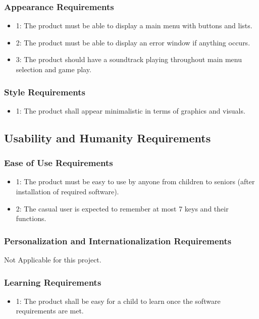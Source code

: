 \documentclass[12pt]{article}
\begin{document}
\subsubsection*{Appearance Requirements}
\begin{itemize}
\item 1: The product must be able to display a main menu with buttons and lists.
\item 2: The product must be able to display an error window if anything occurs.
\item 3: The product should have a soundtrack playing throughout main menu selection and game play.
\end{itemize}

\subsubsection*{Style Requirements}
\begin{itemize}
\item 1: The product shall appear minimalistic in terms of graphics and visuals.
\end{itemize}

\subsection{Usability and Humanity Requirements}
\subsubsection*{Ease of Use Requirements}
\begin{itemize}
\item 1: The product must be easy to use by anyone from children to seniors (after installation of required software).
\item 2:  The casual user is expected to remember at most 7 keys and their functions.
\end{itemize}

\subsubsection*{Personalization and Internationalization Requirements}
Not Applicable for this project.

\subsubsection*{Learning Requirements}
\begin{itemize}
\item 1: The product shall be easy for a child to learn once the software requirements are met.
\end{itemize}
\end{document}
